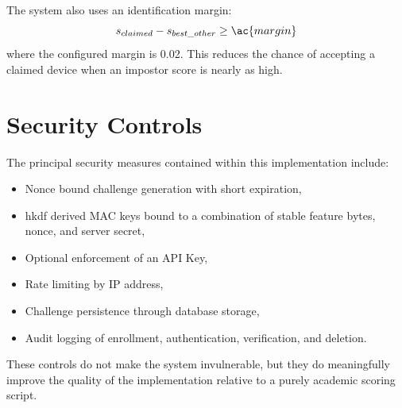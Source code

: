 The system also uses an identification margin:
\begin{equation}
s_{claimed} - s_{best\_other} \geq \ac{margin}
\end{equation}
where the configured margin is 0.02. This reduces the chance of accepting a claimed device when an impostor score is nearly as high.

\section{Security Controls}
The principal security measures contained within this implementation include:
\begin{itemize}
	\item Nonce bound challenge generation with short expiration,
	\item \ac{hkdf} derived MAC keys bound to a combination of stable feature bytes, nonce, and server secret,
	\item Optional enforcement of an API Key,
	\item Rate limiting by IP address,
	\item Challenge persistence through database storage,
	\item Audit logging of enrollment, authentication, verification, and deletion.
\end{itemize}

These controls do not make the system invulnerable, but they do meaningfully improve the quality of the implementation relative to a purely academic scoring script.
